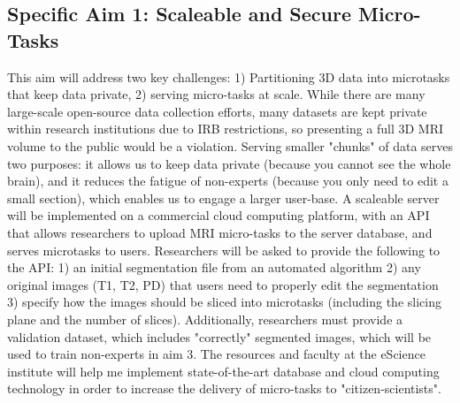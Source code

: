 \subsection*{Specific Aim 1: Scaleable and Secure Micro-Tasks}

This aim will address two key challenges: 1) Partitioning 3D data into microtasks that keep data private, 2) serving micro-tasks at scale. While there are many large-scale open-source data collection efforts, many datasets are kept private within research institutions due to  IRB restrictions, so presenting a full 3D MRI volume to the public would be a violation. Serving smaller "chunks" of data serves two purposes: it allows us to keep data private (because you cannot see the whole brain), and it reduces the fatigue of non-experts (because you only need to edit a small section), which enables us to engage a larger user-base. A scaleable server will be implemented on a commercial cloud computing platform, with an API that allows researchers to upload MRI micro-tasks to the server database, and serves microtasks to users. Researchers will be asked to provide the following to the API: 1) an initial segmentation file from an automated algorithm 2) any original images (T1, T2, PD) that users need to properly edit the segmentation 3) specify how the images should be sliced into microtasks (including the slicing plane and the number of slices). Additionally, researchers must provide a validation dataset, which includes "correctly" segmented images, which will be used to train non-experts in aim 3. The resources and faculty at the eScience institute will help me implement state-of-the-art database and cloud computing technology in order to increase the delivery of micro-tasks to "citizen-scientists".